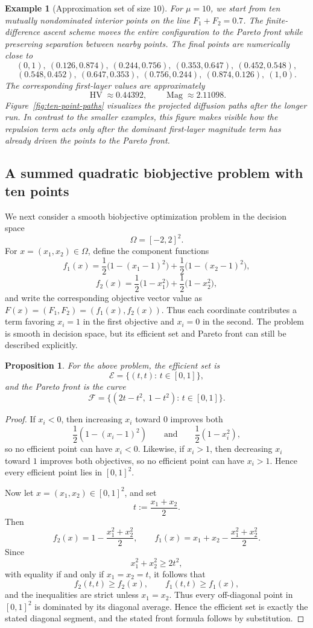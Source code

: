 \documentclass{article}
\newtheorem{proposition}{Proposition}
\newtheorem{example}{Example}
\newcommand{\Mag}{\operatorname{Mag}}
\newcommand{\HV}{\operatorname{HV}}
\begin{document}
\begin{example}[Approximation set of size $10$]
For $\mu=10$, we start from ten mutually nondominated interior points on the line $F_1+F_2=0.7$. The finite-difference ascent scheme moves the entire configuration to the Pareto front while preserving separation between nearby points. The final points are numerically close to
\[
(0,1),\ (0.126,0.874),\ (0.244,0.756),\ (0.353,0.647),\ (0.452,0.548),
\]
\[
(0.548,0.452),\ (0.647,0.353),\ (0.756,0.244),\ (0.874,0.126),\ (1,0).
\]
The corresponding first-layer values are approximately
\[
\HV\approx 0.44392,
\qquad
\Mag\approx 2.11098.
\]
Figure~\ref{fig:ten-point-paths} visualizes the projected diffusion paths after the longer run. In contrast to the smaller examples, this figure makes visible how the repulsion term acts only after the dominant first-layer magnitude term has already driven the points to the Pareto front.
\end{example}


\subsection{A summed quadratic biobjective problem with ten points}

We next consider a smooth biobjective optimization problem in the decision space
\[
\Omega=[-2,2]^2.
\]
For $x=(x_1,x_2)\in\Omega$, define the component functions
\[
f_1(x)=\frac12\bigl(1-(x_1-1)^2\bigr)+\frac12\bigl(1-(x_2-1)^2\bigr),
\]
\[
f_2(x)=\frac12\bigl(1-x_1^2\bigr)+\frac12\bigl(1-x_2^2\bigr),
\]
and write the corresponding objective vector value as $F(x)=(F_1,F_2)=(f_1(x),f_2(x))$.
Thus each coordinate contributes a term favoring $x_i=1$ in the first objective and $x_i=0$ in the second. The problem is smooth in decision space, but its efficient set and Pareto front can still be described explicitly.

\begin{proposition}
For the above problem, the efficient set is
\[
\mathcal E=\{(t,t):\,t\in[0,1]\},
\]
and the Pareto front is the curve
\[
\mathcal F
=
\bigl\{(2t-t^2,\ 1-t^2):\, t\in[0,1]\bigr\}.
\]
\end{proposition}

\begin{proof}
If $x_i<0$, then increasing $x_i$ toward $0$ improves both
\[
\frac12(1-(x_i-1)^2)
\qquad\text{and}\qquad
\frac12(1-x_i^2),
\]
so no efficient point can have $x_i<0$. Likewise, if $x_i>1$, then decreasing $x_i$ toward $1$ improves both objectives, so no efficient point can have $x_i>1$. Hence every efficient point lies in $[0,1]^2$.

Now let $x=(x_1,x_2)\in[0,1]^2$, and set
\[
t:=\frac{x_1+x_2}{2}.
\]
Then
\[
f_2(x)=1-\frac{x_1^2+x_2^2}{2},
\qquad
f_1(x)=x_1+x_2-\frac{x_1^2+x_2^2}{2}.
\]
Since
\[
x_1^2+x_2^2 \ge 2t^2,
\]
with equality if and only if $x_1=x_2=t$, it follows that
\[
f_2(t,t)\ge f_2(x),
\qquad
f_1(t,t)\ge f_1(x),
\]
and the inequalities are strict unless $x_1=x_2$. Thus every off-diagonal point in $[0,1]^2$ is dominated by its diagonal average. Hence the efficient set is exactly the stated diagonal segment, and the stated front formula follows by substitution.
\end{proof}
\end{document}
